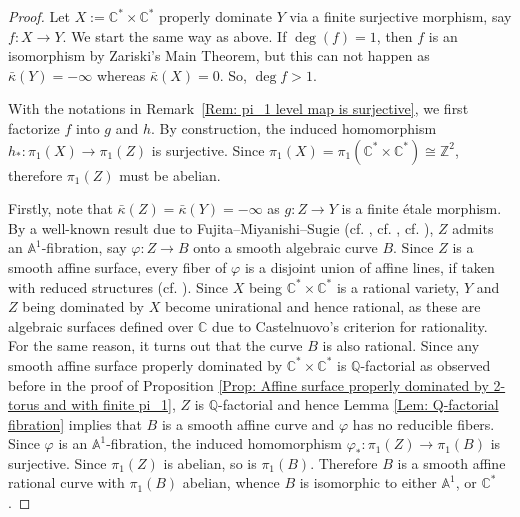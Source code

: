 \documentclass[12pt,reqno,twoside]{amsart}
\theoremstyle{definition}
\numberwithin{equation}{section}
\newcommand{\A}{\mathbb{A}}
\newcommand{\C}{\mathbb{C}}
\newcommand{\Q}{\mathbb{Q}}
\newcommand{\Z}{\mathbb{Z}}
\newcommand{\Kbar}{\bar{\kappa}}
\begin{document}
\begin{proof}
    Let $X:=\C^* \times \C^*$ properly dominate $Y$ via a finite surjective morphism, say $f: X \to Y$. We start the same way as above. If $\deg(f)=1$, then $f$ is an isomorphism by Zariski's Main Theorem, but this can not happen as $\Kbar(Y)=-\infty$ whereas $\Kbar(X)=0$. So, $\deg f>1$.

    With the notations in Remark~\ref{Rem: pi_1 level map is surjective}, we first factorize $f$ into $g$ and $h$. By construction, the induced homomorphism $h_\ast : \pi_1(X) \to \pi_1(Z)$ is surjective. Since $\pi_1(X)=\pi_1(\C^*\times \C^*)\cong \Z^2$, therefore $\pi_1(Z)$ must be abelian.
    
    Firstly, note that $\Kbar(Z)=\Kbar(Y)=-\infty$ as $g: Z \to Y$ is a finite {\'e}tale morphism. By a well-known result due to Fujita--Miyanishi--Sugie (cf. \cite{Fuj1979}, cf. \cite{MS1980}, cf. \cite{Sug1980}), $Z$ admits an $\A^1$-fibration, say $\varphi:Z \to B$ onto a smooth algebraic curve $B$. Since $Z$ is a smooth affine surface, every fiber of $\varphi$ is a disjoint union of affine lines, if taken with reduced structures (cf. \cite{Miy1981}). Since $X$ being $\C^*\times \C^*$ is a rational variety, $Y$ and $Z$ being dominated by $X$ become unirational and hence rational, as these are algebraic surfaces defined over $\C$ due to Castelnuovo's criterion for rationality. For the same reason, it turns out that the curve $B$ is also rational. Since any smooth affine surface properly dominated by $\C^*\times \C^*$ is $\Q$-factorial as observed before in the proof of Proposition \ref{Prop: Affine surface properly dominated by 2-torus and with finite pi_1}, $Z$ is $\Q$-factorial and hence Lemma \ref{Lem: Q-factorial fibration} implies that $B$ is a smooth affine curve and $\varphi$ has no reducible fibers. Since $\varphi$ is an $\A^1$-fibration, the induced homomorphism $\varphi_\ast: \pi_1(Z) \to \pi_1(B)$ is surjective. Since $\pi_1(Z)$ is abelian, so is $\pi_1(B)$. Therefore $B$ is a smooth affine rational curve with $\pi_1(B)$ abelian, whence $B$ is isomorphic to either $\A^1$, or $\C^*$.
    	

\end{proof}
\end{document}
